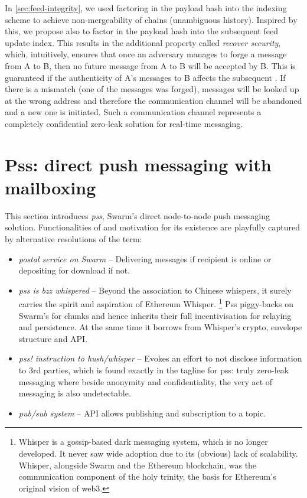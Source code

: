 In \ref{sec:feed-integrity}, we used factoring in the payload hash into the indexing scheme to achieve non-mergeability of chains (unambiguous history). Inspired by this, we propose also to factor in the payload hash into the subsequent feed update index. This results in the additional property called \emph{recover security},  which, intuitively, ensures that once an adversary manages to forge a message from A to B, then no future message from A to B will be accepted by B.
This is guaranteed if the authenticity of A's  messages to B affects the subsequent . If there is a mismatch (one of the messages was forged), messages will be looked up at the wrong address and therefore the communication channel will be abandoned and a new one is initiated. Such a communication channel represents a completely confidential zero-leak solution for real-time messaging.




\section{Pss: direct push messaging with mailboxing \statusgreen}\label{sec:pss}

\green{}

This section introduces \emph{pss}, Swarm's direct node-to-node push messaging solution. 
Functionalities of and motivation for its existence are playfully captured by alternative resolutions of the term:

\begin{itemize}
\item \emph{postal service on Swarm} -- Delivering messages if recipient is online or depositing for download if not.
\item \emph{pss is bzz whispered} -- Beyond the association to Chinese whispers, it surely carries the spirit and aspiration of Ethereum Whisper.%
%
\footnote{Whisper is a gossip-based dark messaging system, which is no longer developed. It never saw wide adoption due to its (obvious) lack of scalability. Whisper, alongside Swarm and the Ethereum blockchain, was the communication component of the holy trinity, the basis for Ethereum's original vision of web3.}
%
Pss piggy-backs on Swarm's  for chunks and hence inherits their full incentivisation for relaying and persistence. At the same time it borrows from Whisper's crypto, envelope structure and API.
\item \emph{pss! instruction to hush/whisper} -- Evokes an effort to not disclose information to 3rd parties, which is found exactly in the tagline for pss: truly zero-leak messaging where beside anonymity and confidentiality, the very act of messaging is also undetectable.
\item  \emph{pub/sub system} -- API allows publishing and subscription to a topic.
\end{itemize}

